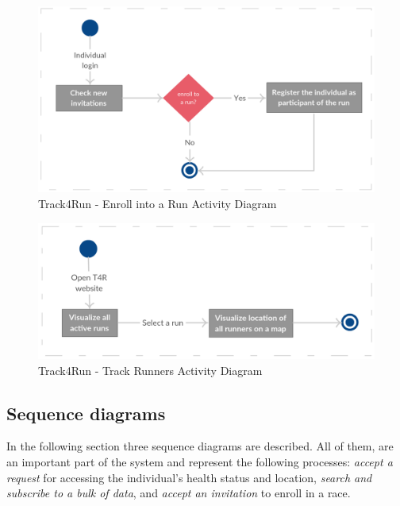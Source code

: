 \documentclass[a4paper, hidelinks, 12pt]{report}
\begin{document}
	\begin{figure}[H]
		\centering
		\includegraphics[width=1\textwidth]{Diagrams/t4r_enrolment_activity_diagram.png}
		\caption[Track4Run - Enroll into a Run Activity Diagram]{Track4Run - Enroll into a Run Activity Diagram}
		\label{fig:t4r_act_enrolment}
	\end{figure}
	
	\begin{figure}[H]
		\centering
		\includegraphics[width=1\textwidth]{Diagrams/t4r_track_runners_activity_diagram.png}
		\caption[Track4Run - Track Runners Activity Diagram]{Track4Run - Track Runners Activity Diagram}
		\label{fig:t4r_act_track_runners}
	\end{figure}
	
	\subsection{Sequence diagrams}
	In the following section three sequence diagrams are described. All of them, are an important part of the system and represent the following processes: \textit{accept a request} for accessing the individual's health status and location, \textit{search and subscribe to a bulk of data}, and \textit{accept an invitation} to enroll in a race.\\
	
\end{document}
